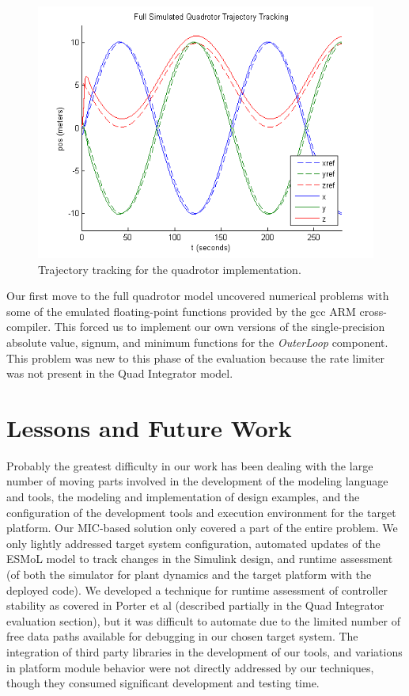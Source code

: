 \begin{figure}[thb]
\centering
\includegraphics[width=\columnwidth]{figures/qr_tracking.png}
    \caption{Trajectory tracking for the quadrotor implementation.}
    \label{fig:qr_tracking}
\end{figure}

Our first move to the full quadrotor model uncovered numerical problems with some of the emulated floating-point functions provided by the gcc ARM cross-compiler.  This forced us to implement our own versions of the single-precision absolute value, signum, and minimum functions for the \emph{OuterLoop} component.  This problem was new to this phase of the evaluation because the rate limiter was not present in the Quad Integrator model.

\section{Lessons and Future Work}


Probably the greatest difficulty in our work has been dealing with the large number of moving parts involved in the development of the modeling language and tools, the modeling and implementation of design examples, and the configuration of the development tools and execution environment for the target platform.  Our MIC-based solution only covered a part of the entire problem.   We only lightly addressed target system configuration, automated updates of the ESMoL model to track changes in the Simulink design, and runtime assessment (of both the simulator for plant dynamics and the target platform with the deployed code).  We developed a technique for runtime assessment of controller stability as covered in Porter et al\cite{pass:validation} (described partially in the Quad Integrator evaluation section), but it was difficult to automate due to the limited number of free data paths available for debugging in our chosen target system.   The integration of third party libraries in the development of our tools, and variations in platform module behavior were not directly addressed by our techniques, though they consumed 
significant development and testing time.

